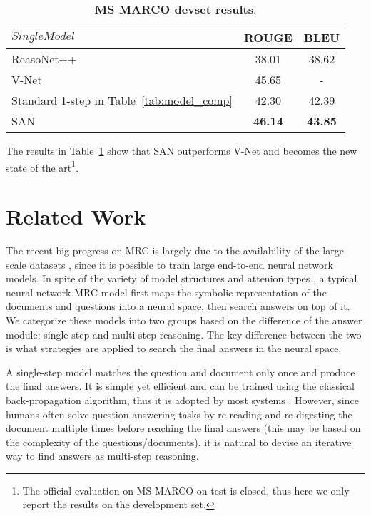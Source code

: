 \documentclass[11pt,a4paper]{article}
\begin{document}
\begin{table}[t!]
\centering
\begin{tabular}{@{\hskip1pt} l @{\hskip1pt} ||@{\hskip1pt} c @{\hskip1pt} | @{\hskip1pt} c }
\hline
$Single Model$	& ROUGE & BLEU \\ \hline\hline
ReasoNet++\cite{shen2017empirical} &38.01 & 38.62\\ \hline
V-Net\cite{multi-passage-mrc2018} & 45.65 & - \\ \hline \hline
Standard 1-step in Table~\ref{tab:model_comp}  &42.30 &42.39 \\ \hline 
SAN &\textbf{46.14} & \textbf{43.85} \\ \hline
\end{tabular}
\caption{\label{tab:comp_marco} 
\textbf{MS MARCO devset results}.} 
\end{table}



The results in Table~\ref{tab:comp_marco} show that SAN outperforms V-Net \cite{multi-passage-mrc2018} and becomes the new state of the art\footnote{The official evaluation on MS MARCO on test is closed, thus here we only report the results on the development set.}.










\section{Related Work}
The recent big progress on MRC is largely due to the availability of the large-scale datasets \cite{rajpurkar2016squad, nguyen2016ms, richardson13mctest, hill2015goldilocks}, since it is possible to train large end-to-end neural network models. 
In spite of the variety of model structures and attenion types \cite{bahdanau2014neural, chen2016thorough, xiong2016dynamic, seo2016bidirectional, shen2017empirical, wang2017gated}, a typical neural network MRC model first maps the symbolic representation of the documents and questions into a neural space, then search answers on top of it. We categorize these models into two groups based on the difference of the answer module: single-step and multi-step reasoning.
The key difference between the two is what strategies are applied to search the final answers in the neural space.

A single-step model matches the question and document only once and produce the final answers. It is simple yet efficient and can be trained using the classical back-propagation algorithm, thus it is adopted by most systems \cite{chen2016thorough, seo2016bidirectional, wang2017gated, liu2017phase, chen2017reading, weissenborn2017fastqa, hu2017mnemonic}. However, since humans often solve question answering tasks by re-reading and re-digesting the document multiple times before reaching the final answers (this may be based on the complexity of the questions/documents), it is natural to devise an iterative way to find answers as multi-step reasoning.
\end{document}
